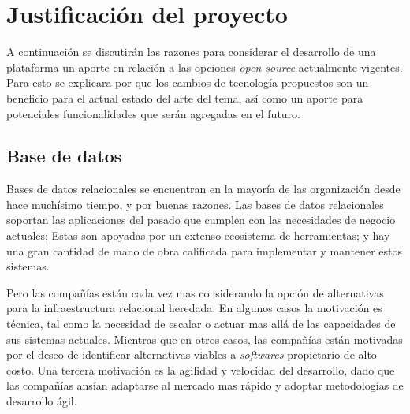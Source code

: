 
\chapter{Justificación del proyecto}\label{cap:justificacion_proyecto}


A continuación se discutirán las razones para considerar el desarrollo de una plataforma \ecommerce un aporte en relación a las opciones \textit{open source} actualmente vigentes. Para esto se explicara por que los cambios de tecnología propuestos son un beneficio para el actual estado del arte del tema, así como un aporte para potenciales funcionalidades que serán agregadas en el futuro.


\section{Base de datos}

Bases de datos relacionales se encuentran en la mayoría de las organización desde hace muchísimo tiempo, y por buenas razones. Las bases de datos relacionales soportan las aplicaciones del pasado que cumplen con las necesidades de negocio actuales; Estas son apoyadas por un extenso ecosistema de herramientas; y hay una gran cantidad de mano de obra calificada para implementar y mantener estos sistemas.

Pero las compañías están cada vez mas considerando la opción de alternativas para la infraestructura relacional heredada. En algunos casos la motivación es técnica, tal como la necesidad de escalar o actuar mas allá de las capacidades de sus sistemas actuales. Mientras que en otros casos, las compañías están motivadas por el deseo de identificar alternativas viables a \textit{softwares} propietario de alto costo. Una tercera motivación es la agilidad y velocidad del desarrollo, dado que las compañías ansían adaptarse al mercado mas rápido y adoptar metodologías de desarrollo ágil.


